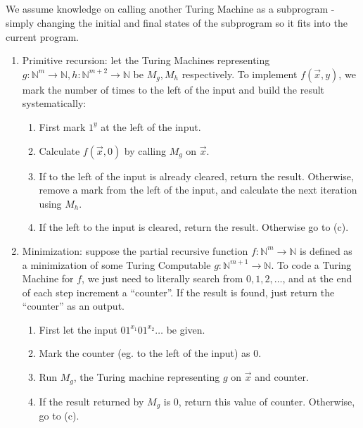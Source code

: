 \documentclass{article}
\theoremstyle{plain}
\newcommand{\N}{\mathbb{N}}
\begin{document}
\subsection{}
We assume knowledge on calling another Turing Machine as a subprogram - simply
changing the initial and final states of the subprogram so it fits into the
current program.
\begin{enumerate}[label={\Roman*.}]
  \item {
    Primitive recursion: let the Turing Machines representing
    $g:\N^{m}\to\N, h:\N^{m+2}\to\N$ be $M_{g}, M_{h}$ respectively. To implement
    $f(\overrightarrow{x},y)$, we mark the number of times to the left of the
    input and build the result systematically:
    \begin{enumerate}
      \item First mark $1^{y}$ at the left of the input.
      \item Calculate $f(\overrightarrow{x}, 0)$ by calling $M_{g}$ on
            $\overrightarrow{x}$.
      \item If to the left of the input is already cleared, return the result.
            Otherwise, remove a mark from the left of the input, and calculate
            the next iteration using $M_{h}$.
      \item If the left to the input is cleared, return the result. Otherwise
            go to (c).
    \end{enumerate}
  }
  \item { Minimization: suppose the partial recursive function $f:\N^{m}\to\N$ is
        defined as a minimization of some Turing Computable $g:\N^{m+1}\to\N$. To
        code a Turing Machine for $f$, we just need to literally search from
        ${0,1,2,\ldots}$, and at the end of each step increment a ``counter''. If the
        result is found, just return the ``counter'' as an output.
    \begin{enumerate}
      \item First let the input $01^{x_{1}}01^{x_{2}}\ldots$ be given.
      \item Mark the counter (eg. to the left of the input) as $0$.
      \item Run $M_{g}$, the Turing machine representing $g$ on
            $\overrightarrow{x}$ and counter.
      \item If the result returned by $M_{g}$ is $0$, return this value of
            counter. Otherwise, go to (c).
    \end{enumerate}
  }
\end{enumerate}

\end{document}
